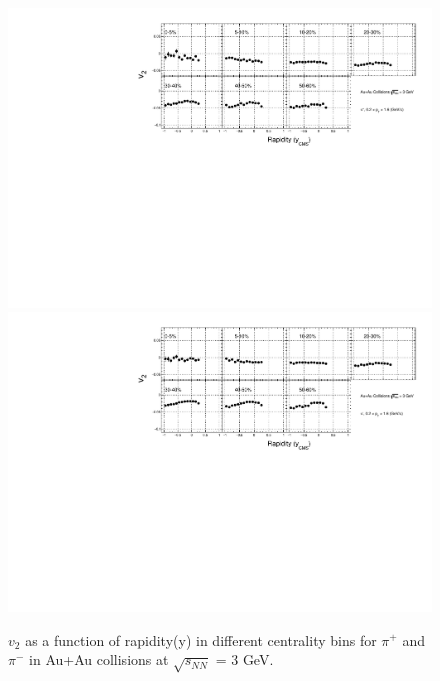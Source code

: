 \begin{figure}[h]
\includegraphics[scale=0.4]{chapter3/fig/v2ypikp/v2y_cent_pionp.pdf}
\includegraphics[scale=0.4]{chapter3/fig/v2ypikp/v2y_cent_pionm.pdf}
\caption{\label{pion_v2y_cent} $v_{2}$ as a function of rapidity(y) in different centrality bins for $\pi^{+}$ and $\pi^{-}$ in Au+Au collisions at $\sqrt{s_{NN}}$ = 3 GeV.}
\end{figure}

